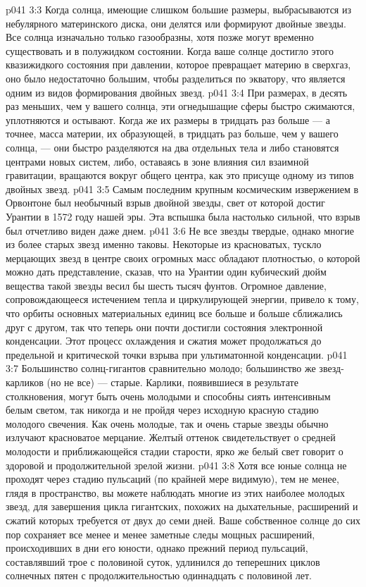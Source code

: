 \vs p041 3:3 \pc Когда солнца, имеющие слишком большие размеры, выбрасываются из небулярного материнского диска, они делятся или формируют двойные звезды. Все солнца изначально только газообразны, хотя позже могут временно существовать и в полужидком состоянии. Когда ваше солнце достигло этого квазижидкого состояния при давлении, которое превращает материю в сверхгаз, оно было недостаточно большим, чтобы разделиться по экватору, что является одним из видов формирования двойных звезд.
\vs p041 3:4 При размерах, в десять раз меньших, чем у вашего солнца, эти огнедышащие сферы быстро сжимаются, уплотняются и остывают. Когда же их размеры в тридцать раз больше --- а точнее, масса материи, их образующей, в тридцать раз больше, чем у вашего солнца, --- они быстро разделяются на два отдельных тела и либо становятся центрами новых систем, либо, оставаясь в зоне влияния сил взаимной гравитации, вращаются вокруг общего центра, как это присуще одному из типов двойных звезд.
\vs p041 3:5 \pc Самым последним крупным космическим извержением в Орвонтоне был необычный взрыв двойной звезды, свет от которой достиг Урантии в 1572 году нашей эры. Эта вспышка была настолько сильной, что взрыв был отчетливо виден даже днем.
\vs p041 3:6 \pc Не все звезды твердые, однако многие из более старых звезд именно таковы. Некоторые из красноватых, тускло мерцающих звезд в центре своих огромных масс обладают плотностью, о которой можно дать представление, сказав, что на Урантии один кубический дюйм вещества такой звезды весил бы шесть тысяч фунтов. Огромное давление, сопровождающееся истечением тепла и циркулирующей энергии, привело к тому, что орбиты основных материальных единиц все больше и больше сближались друг с другом, так что теперь они почти достигли состояния электронной конденсации. Этот процесс охлаждения и сжатия может продолжаться до предельной и критической точки взрыва при ультиматонной конденсации.
\vs p041 3:7 Большинство солнц\hyp{}гигантов сравнительно молодо; большинство же звезд\hyp{}карликов (но не все) --- старые. Карлики, появившиеся в результате столкновения, могут быть очень молодыми и способны сиять интенсивным белым светом, так никогда и не пройдя через исходную красную стадию молодого свечения. Как очень молодые, так и очень старые звезды обычно излучают красноватое мерцание. Желтый оттенок свидетельствует о средней молодости и приближающейся стадии старости, ярко же белый свет говорит о здоровой и продолжительной зрелой жизни.
\vs p041 3:8 \pc Хотя все юные солнца не проходят через стадию пульсаций (по крайней мере видимую), тем не менее, глядя в пространство, вы можете наблюдать многие из этих наиболее молодых звезд, для завершения цикла гигантских, похожих на дыхательные, расширений и сжатий которых требуется от двух до семи дней. Ваше собственное солнце до сих пор сохраняет все менее и менее заметные следы мощных расширений, происходивших в дни его юности, однако прежний период пульсаций, составлявший трое с половиной суток, удлинился до теперешних циклов солнечных пятен с продолжительностью одиннадцать с половиной лет.
